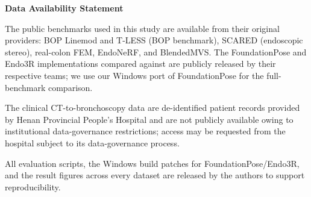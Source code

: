 \documentclass[11pt]{article}
\begin{document}
\begin{center}\textbf{Data Availability Statement}\end{center}

The public benchmarks used in this study are available from their original
providers: BOP Linemod and T-LESS (BOP benchmark), SCARED (endoscopic stereo),
real-colon FEM, EndoNeRF, and BlendedMVS. The FoundationPose and Endo3R
implementations compared against are publicly released by their respective
teams; we use our Windows port of FoundationPose for the full-benchmark
comparison.

The clinical CT-to-bronchoscopy data are de-identified patient records provided
by Henan Provincial People's Hospital and are not publicly available owing to
institutional data-governance restrictions; access may be requested from the
hospital subject to its data-governance process.

All evaluation scripts, the Windows build patches for FoundationPose/Endo3R,
and the result figures across every dataset are released by the authors to
support reproducibility.
\end{document}
